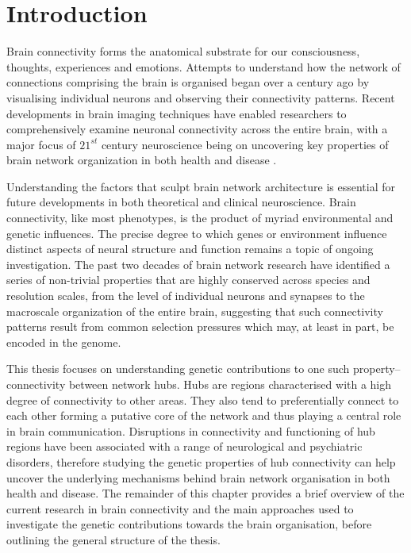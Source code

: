 \chapter{Introduction}
\label{ch:Introduction}

Brain connectivity forms the anatomical substrate for our consciousness, thoughts, experiences and emotions. Attempts to understand how the network of connections comprising the brain is organised began over a century ago by visualising individual neurons and observing their connectivity patterns. Recent developments in brain imaging techniques have enabled researchers to comprehensively examine neuronal connectivity across the entire brain, with a major focus of $21^{st}$ century neuroscience being on uncovering key properties of brain network organization in both health and disease \citep{VandenHeuvel2010b,Bullmore2012,Fornito2015}. 

Understanding the factors that sculpt brain network architecture is essential for future developments in both theoretical and clinical neuroscience. Brain connectivity, like most phenotypes, is the product of myriad environmental and genetic influences. The precise degree to which genes or environment influence distinct aspects of neural structure and function remains a topic of ongoing investigation. The past two decades of brain network research have identified a series of non-trivial properties that are highly conserved across species and resolution scales, from the level of individual neurons and synapses to the macroscale organization of the entire brain, suggesting that such connectivity patterns result from common selection pressures which may, at least in part, be encoded in the genome. 

This thesis focuses on understanding genetic contributions to one such property--connectivity between network hubs. Hubs are regions characterised with a high degree of connectivity to other areas. They also tend to preferentially connect to each other forming a putative core of the network and thus playing a central role in brain communication. Disruptions in connectivity and functioning of hub regions have been associated with a range of neurological and psychiatric disorders, therefore studying the genetic properties of hub connectivity can help uncover the underlying mechanisms behind brain network organisation in both health and disease. The remainder of this chapter provides a brief overview of the current research in brain connectivity and the main approaches used to investigate the genetic contributions towards the brain organisation, before outlining the general structure of the thesis. 


